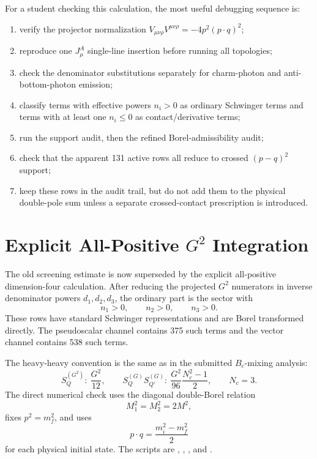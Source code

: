 \documentclass[11pt]{article}
\begin{document}
For a student checking this calculation, the most useful debugging sequence is:
\begin{enumerate}
  \item verify the projector normalization
  \(V_{\mu\nu\rho}V^{\mu\nu\rho}=-4p^2(p\cdot q)^2\);
  \item reproduce one \(J^A_\mu\) single-line insertion before running all
  topologies;
  \item check the denominator substitutions separately for charm-photon and
  anti-bottom-photon emission;
  \item classify terms with effective powers \(n_i>0\) as ordinary Schwinger
  terms and terms with at least one \(n_i\le0\) as contact/derivative terms;
  \item run the support audit, then the refined Borel-admissibility audit;
  \item check that the apparent 131 active rows all reduce to crossed
  \((p-q)^2\) support;
  \item keep these rows in the audit trail, but do not add them to the
  physical double-pole sum unless a separate crossed-contact prescription is
  introduced.
\end{enumerate}

\section{Explicit All-Positive \texorpdfstring{\(G^2\)}{G2} Integration}

The old screening estimate is now superseded by the explicit all-positive
dimension-four calculation.  After reducing the projected \(G^2\) numerators in
inverse denominator powers \(d_1,d_2,d_3\), the ordinary part is the sector with
\[
  n_1>0,\qquad n_2>0,\qquad n_3>0 .
\]
These rows have standard Schwinger representations and are Borel transformed
directly.  The pseudoscalar channel contains 375 such terms and the vector
channel contains 538 such terms.

The heavy-heavy convention is the same as in the submitted \(B_c\)-mixing
analysis:
\[
  S_Q^{(G^2)}:\ \frac{G^2}{12},\qquad
  S_Q^{(G)}S_{Q'}^{(G)}:\ \frac{G^2}{96}\frac{N_c^2-1}{2},\qquad N_c=3 .
\]
The direct numerical check uses the diagonal double-Borel relation
\[
  M_1^2=M_2^2=2M^2 ,
\]
fixes \(p^2=m_f^2\), and uses
\[
  p\cdot q=\frac{m_i^2-m_f^2}{2}
\]
for each physical initial state.  The scripts are
,
,
, and
.
\end{document}
